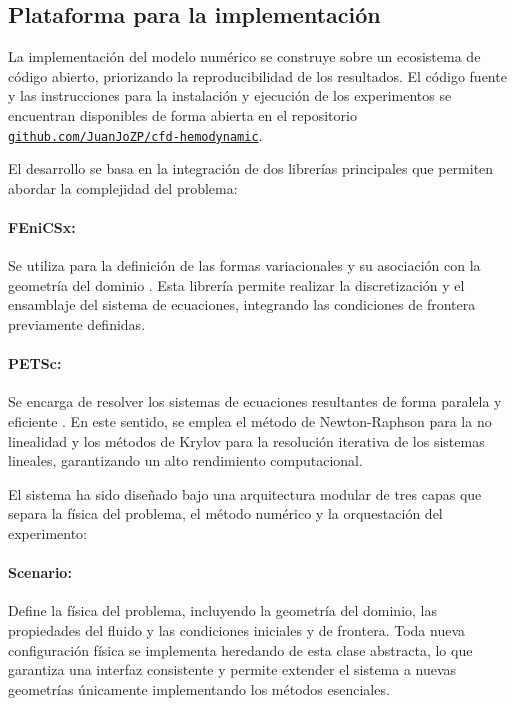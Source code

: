 \documentclass[12pt, letterpaper]{article}
\begin{document}
\subsection{Plataforma para la implementación}

La implementación del modelo numérico se construye sobre un ecosistema de código abierto, priorizando la reproducibilidad de los resultados. El código fuente y las instrucciones para la instalación y ejecución de los experimentos se encuentran disponibles de forma abierta en el repositorio \href{https://github.com/JuanJoZP/cfd-hemodynamic}{\texttt{github.com/JuanJoZP/cfd-hemodynamic}}. 

El desarrollo se basa en la integración de dos librerías principales que permiten abordar la complejidad del problema:

\paragraph{FEniCSx:} Se utiliza para la definición de las formas variacionales y su asociación con la geometría del dominio \cite{BarattaEtal2023}. Esta librería permite realizar la discretización y el ensamblaje del sistema de ecuaciones, integrando las condiciones de frontera previamente definidas.

\paragraph{PETSc:} Se encarga de resolver los sistemas de ecuaciones resultantes de forma paralela y eficiente \cite{dalcin_parallel_2011}. En este sentido, se emplea el método de Newton-Raphson para la no linealidad y los métodos de Krylov para la resolución iterativa de los sistemas lineales, garantizando un alto rendimiento computacional.

El sistema ha sido diseñado bajo una arquitectura modular de tres capas que separa la física del problema, el método numérico y la orquestación del experimento:

\paragraph{Scenario:} Define la física del problema, incluyendo la geometría del dominio, las propiedades del fluido y las condiciones iniciales y de frontera. Toda nueva configuración física se implementa heredando de esta clase abstracta, lo que garantiza una interfaz consistente y permite extender el sistema a nuevas geometrías únicamente implementando los métodos esenciales.
\end{document}
